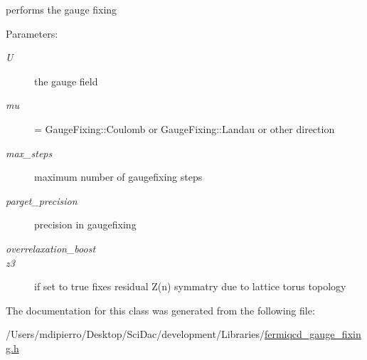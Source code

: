 performs the gauge fixing \begin{Desc}
\item[Parameters:]
\begin{description}
\item[{\em U}]the gauge field \item[{\em mu}]= GaugeFixing::Coulomb or GaugeFixing::Landau or other direction \item[{\em max\_\-steps}]maximum number of gaugefixing steps \item[{\em parget\_\-precision}]precision in gaugefixing \item[{\em overrelaxation\_\-boost}]\item[{\em z3}]if set to true fixes residual Z(n) symmatry due to lattice torus topology \end{description}
\end{Desc}


The documentation for this class was generated from the following file:\begin{CompactItemize}
\item 
/Users/mdipierro/Desktop/SciDac/development/Libraries/\hyperlink{fermiqcd__gauge__fixing_8h}{fermiqcd\_\-gauge\_\-fixing.h}\end{CompactItemize}
